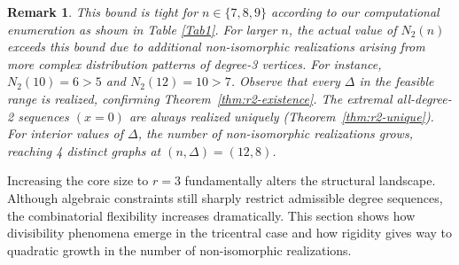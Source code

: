 \documentclass[12pt]{article}
\newtheorem{remark}[theorem]{Remark}
\numberwithin{equation}{section}
\begin{document}
\begin{remark}
This bound is tight for $n \in \{7, 8, 9\}$ according to our computational enumeration as shown in Table \ref{Tab1}.  For larger $n$, the actual value of $N_2(n)$ exceeds this bound due to additional 
non-isomorphic realizations arising from more complex distribution patterns of 
degree-3 vertices. For instance, $N_2(10) = 6 > 5$ and $N_2(12) = 10 > 7$. Observe that every $\Delta$ in the feasible range is realized, confirming Theorem~\ref{thm:r2-existence}.
The extremal all-degree-2 sequences $(x=0)$ are always realized uniquely (Theorem~\ref{thm:r2-unique}).
For interior values of $\Delta$, the number of non-isomorphic realizations grows, reaching 4 distinct graphs at $(n,\Delta) = (12,8)$.
\end{remark}

Increasing the core size to $r=3$ fundamentally alters the structural landscape. Although algebraic constraints still sharply restrict admissible degree sequences, the combinatorial flexibility increases dramatically. This section shows how divisibility phenomena emerge in the tricentral case and how rigidity gives way to quadratic growth in the number of non-isomorphic realizations.
\end{document}
